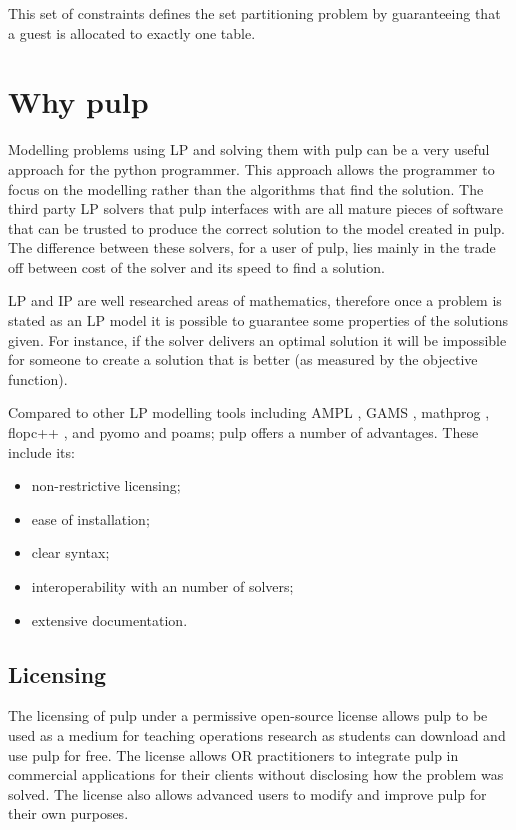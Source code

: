 \documentclass[a4paper,oneside]{arlimsTPPM}
\begin{document}
This set of constraints defines the set partitioning problem by guaranteeing that a guest is allocated to
exactly one table.




\section{Why pulp}
Modelling problems using LP and solving them with pulp can be a very useful approach for the python programmer. 
This approach allows the programmer to focus on the modelling rather than the algorithms that find the solution.
The third party LP solvers that pulp interfaces with are all mature pieces of software that can be trusted to 
produce the correct solution to the model created in pulp. The difference between these solvers, for a user of pulp, 
lies mainly in the trade off between cost of the solver and its speed to find a solution.

LP and IP are well researched areas of mathematics, therefore once a problem is stated as an LP model it is possible 
to guarantee some properties of the solutions given. For instance, if the solver delivers an optimal solution it 
will be impossible for someone to create a solution that is better (as measured by the objective function).

Compared to other LP modelling tools including AMPL \cite{ampl}, GAMS \cite{gams}, mathprog \cite{glpk}, flopc++ \cite{flopc}, and pyomo \cite{pyomo} and poams; pulp offers a number of advantages. These include its:
\begin{itemize}
\item  non-restrictive licensing;
\item  ease of installation;
\item  clear syntax;
\item  interoperability with an number of solvers;
\item  extensive documentation.
\end{itemize}

\subsection{Licensing}
The licensing of pulp under a permissive open-source license allows pulp to be used as a medium for teaching
operations research as students can download and use pulp for free. The license allows OR practitioners to 
integrate pulp in commercial applications for their clients without disclosing how the problem was solved. 
The license also allows advanced users to modify and improve pulp for their own purposes.
\end{document}
